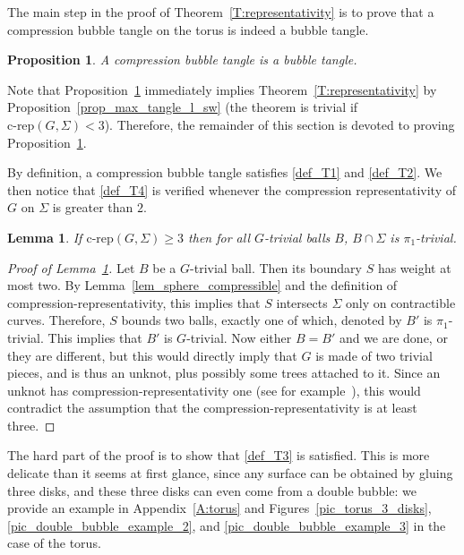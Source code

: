 \documentclass[11pt,a4paper]{article}
\newcommand{\comprep}{\text{c-rep}}
\newtheorem{proposition}[theorem]{Proposition}
\newtheorem{lem}[theorem]{Lemma}
\begin{document}
The main step in the proof of Theorem~\ref{T:representativity} is to prove that a compression bubble tangle on the torus is indeed a bubble tangle. 

\begin{proposition}\label{prop_bubble_tangle}
A compression bubble tangle is a bubble tangle.
\end{proposition}

Note that Proposition~\ref{prop_bubble_tangle} immediately implies Theorem~\ref{T:representativity} by Proposition~\ref{prop_max_tangle_l_sw} (the theorem is trivial if $\comprep(G,\Sigma) <3$). Therefore, the remainder of this section is devoted to proving Proposition~\ref{prop_bubble_tangle}.

By definition, a compression bubble tangle satisfies \ref{def_T1} and \ref{def_T2}. We then notice that \ref{def_T4} is verified whenever the compression representativity of $G$ on $\Sigma$ is greater than $2$.

\begin{lem}\label{lem_T4}
If $\comprep(G,\Sigma) \geq 3$ then for all $G$-trivial balls $B$, $B \cap \Sigma$ is $\pi_1$-trivial.
\end{lem}

\begin{proof}[Proof of Lemma~\ref{lem_T4}]
Let $B$ be a $G$-trivial ball. Then its boundary $S$ has weight at most two. By Lemma~\ref{lem_sphere_compressible} and the definition of compression-representativity, this implies that $S$ intersects $\Sigma$ only on contractible curves. Therefore, $S$ bounds two balls, exactly one of which, denoted by $B'$ is $\pi_1$-trivial. This implies that $B'$ is $G$-trivial. Now either $B=B'$ and we are done, or they are different, but this would directly imply that $G$ is made of two trivial pieces, and is thus an unknot, plus possibly some trees attached to it. Since an unknot has compression-representativity one (see for example~\cite[Example~3.2]{ozawa}), this would contradict the assumption that the compression-representativity is at least three.
\end{proof}

The hard part of the proof is to show that \ref{def_T3} is satisfied. This is more delicate than it seems at first glance, since any surface can be obtained by gluing three disks, and these three disks can even come from a double bubble: we provide an example in Appendix~\ref{A:torus} and Figures~\ref{pic_torus_3_disks}, \ref{pic_double_bubble_example_2}, and \ref{pic_double_bubble_example_3} in the case of the torus.
\end{document}
